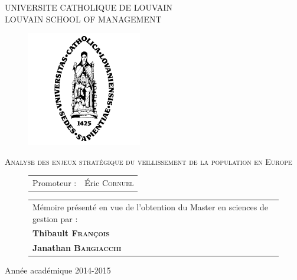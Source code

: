 
\parindent=0cm



\begin{center}
{\large    UNIVERSITE CATHOLIQUE DE LOUVAIN \\
LOUVAIN SCHOOL OF MANAGEMENT \\
}
   \end{center}
\vfill

 \begin{figure}[H]
\begin{center}  \hspace*{-10mm} 
	\includegraphics[height = 5cm]{alma.png}
   \end{center}
\end{figure}


\vfill


\begin{center}
{\Large \textsc{Analyse des enjeux stratégique du veillissement de la population en Europe}}
\end{center}



\vfill

 \begin{figure}[H]
 \begin{minipage}[c]{.45\linewidth}
		\begin{tabular}{ll}
		Promoteur : & Éric \textsc{Cornuel} \\

		\end{tabular}
\end{minipage} \hfill
 \begin{minipage}[c]{.45\linewidth}
 \begin{tabularx}{\linewidth}{p{\textwidth}}
Mémoire présenté en vue de \hbox{l'obtention} du Master en sciences de gestion par :\\
\textbf{Thibault \textsc{François}} \\
\textbf{Janathan \textsc{Bargiacchi}}
\end{tabularx}
\end{minipage}
\end{figure}

\vspace{1,5cm}



\begin{center}
{\large Année académique 2014-2015}
\end{center}
